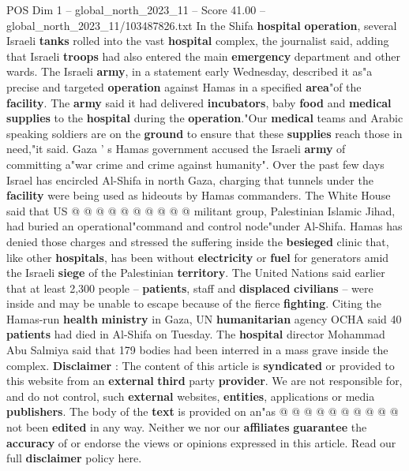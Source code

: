 \begin{textsample}{POS Dim 1 – global\_north\_2023\_11 – Score 41.00 – global\_north\_2023\_11/103487826.txt}
In the Shifa \textbf{hospital} \textbf{operation}, several Israeli \textbf{tanks} rolled into the vast \textbf{hospital} complex, the journalist said, adding that Israeli \textbf{troops} had also entered the main \textbf{emergency} department and other wards.
The Israeli \textbf{army}, in a statement early Wednesday, described it as"a precise and targeted \textbf{operation} against Hamas in a specified \textbf{area}"of the \textbf{facility}.
The \textbf{army} said it had delivered \textbf{incubators}, baby \textbf{food} and \textbf{medical} \textbf{supplies} to the \textbf{hospital} during the \textbf{operation}."Our \textbf{medical} teams and Arabic speaking soldiers are on the \textbf{ground} to ensure that these \textbf{supplies} reach those in need,"it said.
Gaza ' s Hamas government accused the Israeli \textbf{army} of committing a"war crime and crime against humanity".
Over the past few days Israel has encircled Al-Shifa in north Gaza, charging that tunnels under the \textbf{facility} were being used as hideouts by Hamas commanders.
The White House said that US @ @ @ @ @ @ @ @ @ @ militant group, Palestinian Islamic Jihad, had buried an operational"command and control node"under Al-Shifa.
Hamas has denied those charges and stressed the suffering inside the \textbf{besieged} clinic that, like other \textbf{hospitals}, has been without \textbf{electricity} or \textbf{fuel} for generators amid the Israeli \textbf{siege} of the Palestinian \textbf{territory}.
The United Nations said earlier that at least 2,300 people -- \textbf{patients}, staff and \textbf{displaced} \textbf{civilians} -- were inside and may be unable to escape because of the fierce \textbf{fighting}.
Citing the Hamas-run \textbf{health} \textbf{ministry} in Gaza, UN \textbf{humanitarian} agency OCHA said 40 \textbf{patients} had died in Al-Shifa on Tuesday.
The \textbf{hospital} director Mohammad Abu Salmiya said that 179 bodies had been interred in a mass grave inside the complex. \textbf{Disclaimer} : The content of this article is \textbf{syndicated} or provided to this website from an \textbf{external} \textbf{third} party \textbf{provider}.
We are not responsible for, and do not control, such \textbf{external} websites, \textbf{entities}, applications or media \textbf{publishers}.
The body of the \textbf{text} is provided on an"as @ @ @ @ @ @ @ @ @ @ not been \textbf{edited} in any way.
Neither we nor our \textbf{affiliates} \textbf{guarantee} the \textbf{accuracy} of or endorse the views or opinions expressed in this article.
Read our full \textbf{disclaimer} policy here.

\end{textsample}
